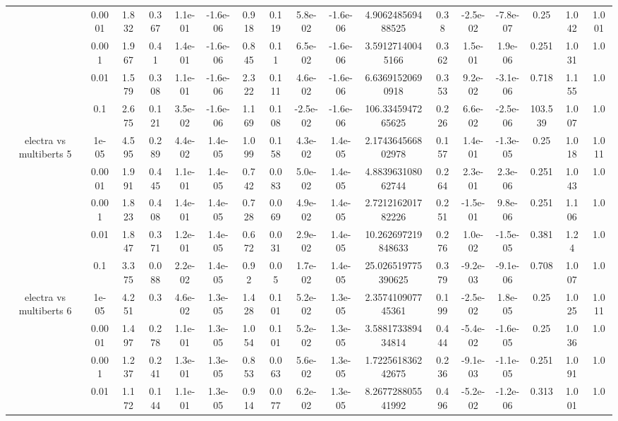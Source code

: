 \begin{tabular}{|c|c|c|c|c|c|c|c|c|c|c|c|c|c|c|c|c|}
 & 0.0001 & 1.832 & 0.367 & 1.1e-01 & -1.6e-06 & 0.918 & 0.119 & 5.8e-02 & -1.6e-06 & 4.906248569488525 & 0.38 & -2.5e-02 & -7.8e-07 & 0.25 & 1.042 & 1.001 \\
 & 0.001 & 1.967 & 0.41 & 1.4e-01 & -1.6e-06 & 0.845 & 0.11 & 6.5e-02 & -1.6e-06 & 3.59127140045166 & 0.362 & 1.5e-01 & 1.9e-06 & 0.251 & 1.031 & 1.0 \\
 & 0.01 & 1.579 & 0.308 & 1.1e-01 & -1.6e-06 & 2.322 & 0.111 & 4.6e-02 & -1.6e-06 & 6.63691520690918 & 0.353 & 9.2e-02 & -3.1e-06 & 0.718 & 1.155 & 1.0 \\
 & 0.1 & 2.675 & 0.121 & 3.5e-02 & -1.6e-06 & 1.169 & 0.108 & -2.5e-02 & -1.6e-06 & 106.3345947265625 & 0.226 & 6.6e-02 & -2.5e-06 & 103.539 & 1.007 & 1.0 \\
\hline
\multirow{5}{*}{electra  vs multiberts 5} & 1e-05 & 4.595 & 0.289 & 4.4e-02 & 1.4e-05 & 1.099 & 0.158 & 4.3e-02 & 1.4e-05 & 2.174364566802978 & 0.157 & 1.4e-01 & -1.3e-05 & 0.25 & 1.018 & 1.011 \\
 & 0.0001 & 1.991 & 0.445 & 1.1e-01 & 1.4e-05 & 0.742 & 0.083 & 5.0e-02 & 1.4e-05 & 4.883963108062744 & 0.264 & 2.3e-01 & 2.3e-06 & 0.251 & 1.043 & 1.0 \\
 & 0.001 & 1.823 & 0.408 & 1.4e-01 & 1.4e-05 & 0.728 & 0.069 & 4.9e-02 & 1.4e-05 & 2.721216201782226 & 0.251 & -1.5e-01 & 9.8e-06 & 0.251 & 1.106 & 1.0 \\
 & 0.01 & 1.847 & 0.371 & 1.2e-01 & 1.4e-05 & 0.672 & 0.031 & 2.9e-02 & 1.4e-05 & 10.262697219848633 & 0.276 & 1.0e-02 & -1.5e-05 & 0.381 & 1.24 & 1.0 \\
 & 0.1 & 3.375 & 0.088 & 2.2e-02 & 1.4e-05 & 0.92 & 0.05 & 1.7e-02 & 1.4e-05 & 25.026519775390625 & 0.379 & -9.2e-03 & -9.1e-06 & 0.708 & 1.007 & 1.0 \\
\hline
\multirow{5}{*}{electra  vs multiberts 6} & 1e-05 & 4.251 & 0.3 & 4.6e-02 & 1.3e-05 & 1.428 & 0.101 & 5.2e-02 & 1.3e-05 & 2.357410907745361 & 0.199 & -2.5e-02 & 1.8e-05 & 0.25 & 1.025 & 1.011 \\
 & 0.0001 & 1.497 & 0.278 & 1.1e-01 & 1.3e-05 & 1.054 & 0.101 & 5.2e-02 & 1.3e-05 & 3.588173389434814 & 0.444 & -5.4e-02 & -1.6e-05 & 0.25 & 1.036 & 1.0 \\
 & 0.001 & 1.237 & 0.241 & 1.3e-01 & 1.3e-05 & 0.853 & 0.063 & 5.6e-02 & 1.3e-05 & 1.722561836242675 & 0.236 & -9.1e-03 & -1.1e-05 & 0.251 & 1.091 & 1.0 \\
 & 0.01 & 1.172 & 0.144 & 1.1e-01 & 1.3e-05 & 0.914 & 0.077 & 6.2e-02 & 1.3e-05 & 8.267728805541992 & 0.496 & -5.2e-02 & -1.2e-06 & 0.313 & 1.001 & 1.0 \\

\end{tabular}
